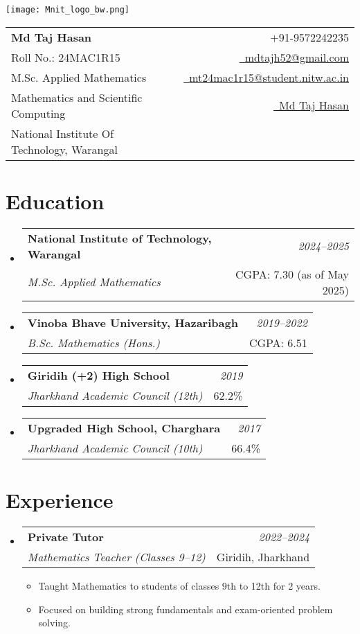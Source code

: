 \documentclass[a4paper,11pt]{article}
\makeatletter
\newcommand{\resumeSubheading}[4]{
\vspace{0.5mm}\item
    \begin{tabular*}{0.98\textwidth}[t]{l@{\extracolsep{\fill}}r}
        \textbf{#1} & \textit{\footnotesize{#4}} \\
        \textit{\footnotesize{#3}} &  \footnotesize{#2}\\
    \end{tabular*}
    \vspace{-2.4mm}
}
\newcommand{\resumeSubHeadingListStart}{\begin{itemize}[leftmargin=*,labelsep=0mm]}
\newcommand{\resumeItemListStart}{\begin{justify}\begin{itemize}[leftmargin=3ex, rightmargin=2ex, noitemsep,labelsep=1.2mm,itemsep=0mm]\small}
\newcommand{\resumeSubHeadingListEnd}{\end{itemize}\vspace{2mm}}
\newcommand{\resumeItemListEnd}{\end{itemize}\end{justify}\vspace{-2mm}}
\newcommand{\name}{Md Taj Hasan}
\newcommand{\course}{M.Sc. Applied Mathematics}
\newcommand{\roll}{24MAC1R15}
\newcommand{\phone}{9572242235}
\newcommand{\emaila}{mdtajh52@gmail.com}
\newcommand{\emailb}{mt24mac1r15@student.nitw.ac.in}
\makeatother
\begin{document}
\selectfont

\parbox{2.35cm}{%
\texttt{[image: Mnit\_logo\_bw.png]}
}
\parbox{\dimexpr\linewidth-2.8cm\relax}{
\begin{tabularx}{\linewidth}{L r} \\
  \textbf{\Large \name} & {\raisebox{0.0\height}{\footnotesize \faPhone}\ +91-\phone}\\
  {Roll No.: \roll} & \href{mailto:\emaila}{\raisebox{0.0\height}{\footnotesize \faEnvelope}\ {\emaila}} \\
  \course &  \href{mailto:\emailb}{\raisebox{0.0\height}{\footnotesize \faEnvelope}\ {\emailb}}\\
  {Mathematics and Scientific Computing} & \href{https://linkedin.com/in/md-taj-hasan-90ab64341}{\raisebox{0.0\height}{\footnotesize \faLinkedin}\ {Md Taj Hasan}}\\
  {National Institute Of Technology, Warangal} 
\end{tabularx}
}

\section{\textbf{Education}}
\resumeSubHeadingListStart
  \resumeSubheading
    {National Institute of Technology, Warangal}{CGPA: 7.30 (as of May 2025)}
    {M.Sc. Applied Mathematics}{2024–2025}
  \resumeSubheading
    {Vinoba Bhave University, Hazaribagh}{CGPA: 6.51}
    {B.Sc. Mathematics (Hons.)}{2019–2022}
  \resumeSubheading
    {Giridih (+2) High School}{62.2\%}
    {Jharkhand Academic Council (12th)}{2019}
  \resumeSubheading
    {Upgraded High School, Charghara}{66.4\%}
    {Jharkhand Academic Council (10th)}{2017}
\resumeSubHeadingListEnd

\section{\textbf{Experience}}
\resumeSubHeadingListStart
  \resumeSubheading
    {Private Tutor}{Giridih, Jharkhand}
    {Mathematics Teacher (Classes 9–12)}{2022–2024}
    \resumeItemListStart
      \item Taught Mathematics to students of classes 9th to 12th for 2 years.
      \item Focused on building strong fundamentals and exam-oriented problem solving.
    \resumeItemListEnd
\resumeSubHeadingListEnd
\end{document}
